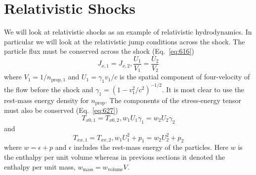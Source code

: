 \section{Relativistic Shocks}
\label{sec:relativistic-shocks}

We will look at relativistic shocks as an example of relativistic
hydrodynamics.  In particular we will look at the relativistic jump
conditions across the shock.  The particle flux must be conserved
across the shock (Eq.~\ref{eq:616})
\begin{equation}
J_{x,1} = J_{x,2}, \frac{U_1}{V_1} = \frac{U_2}{V_2}
\label{eq:854}
\end{equation}
where $V_1=1/n_{\mathrm{prop},1}$ and $U_1 = \gamma_1 v_1/c$
is the spatial component of four-velocity of the flow before the shock
and $\gamma_1=(1-v_1^2/c^2)^{-1/2}$.  It is most clear to use the
rest-mass energy density for $n_\mathrm{prop}$.  The components of the
stress-energy tensor must also be conserved (Eq.~\ref{eq:627})
\begin{equation}
T_{x0,1}=T_{x0,2}, w_1 U_1 \gamma_1= w_2 U_2 \gamma_2
\label{eq:855}
\end{equation}
and
\begin{equation}
T_{xx,1}=T_{xx,2}, w_1 U_1^2 + p_1 = w_2 U_2^2 + p_2
\label{eq:856}
\end{equation}
where $w=\epsilon + p$ and $\epsilon$ includes the rest-mass energy of
the particles.  Here $w$ is the enthalpy per unit volume whereas in
previous sections it denoted the enthalpy per unit mass,
$w_\mathrm{mass}=w_\mathrm{volume} V$.

